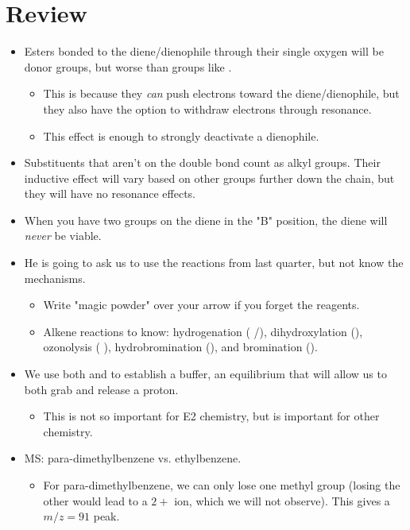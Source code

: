 \documentclass[../notes.tex]{subfiles}
\begin{document}
\section{Review}
\begin{itemize}
    \item {}Esters bonded to the diene/dienophile through their single oxygen will be donor groups, but worse than groups like .
    \begin{itemize}
        \item This is because they \emph{can} push electrons toward the diene/dienophile, but they also have the option to withdraw electrons through resonance.
        \item This effect is enough to strongly deactivate a dienophile.
    \end{itemize}
    \item Substituents that aren't on the double bond count as alkyl groups. Their inductive effect will vary based on other groups further down the chain, but they will have no resonance effects.
    \item When you have two groups on the diene in the "B" position, the diene will \emph{never} be viable.
    \item He is going to ask us to use the reactions from last quarter, but not know the mechanisms.
    \begin{itemize}
        \item Write "magic powder" over your arrow if you forget the reagents.
        \item Alkene reactions to know: hydrogenation ( /), dihydroxylation (), ozonolysis ( ), hydrobromination (), and bromination ().
    \end{itemize}
    \item We use both  and  to establish a buffer, an equilibrium that will allow us to both grab and release a proton.
    \begin{itemize}
        \item This is not so important for E2 chemistry, but is important for other chemistry.
    \end{itemize}
    \item MS: para-dimethylbenzene vs. ethylbenzene.
    \begin{itemize}
        \item For para-dimethylbenzene, we can only lose one methyl group (losing the other would lead to a $2+$ ion, which we will not observe). This gives a $m/z=91$ peak.

\end{itemize}
\end{itemize}
\end{document}
